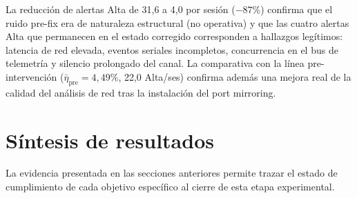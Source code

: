 La reducción de alertas Alta de 31{,}6 a 4{,}0 por sesión ($-87\%$) confirma que el ruido pre-fix era de naturaleza estructural (no operativa) y que las cuatro alertas Alta que permanecen en el estado corregido corresponden a hallazgos legítimos: latencia de red elevada, eventos seriales incompletos, concurrencia en el bus de telemetría y silencio prolongado del canal. La comparativa con la línea pre-intervención ($\bar{\eta}_{\text{pre}}=4{,}49\%$, 22{,}0 Alta/ses) confirma además una mejora real de la calidad del análisis de red tras la instalación del port mirroring.

\section{Síntesis de resultados}

La evidencia presentada en las secciones anteriores permite trazar el estado de cumplimiento de cada objetivo específico al cierre de esta etapa experimental.

